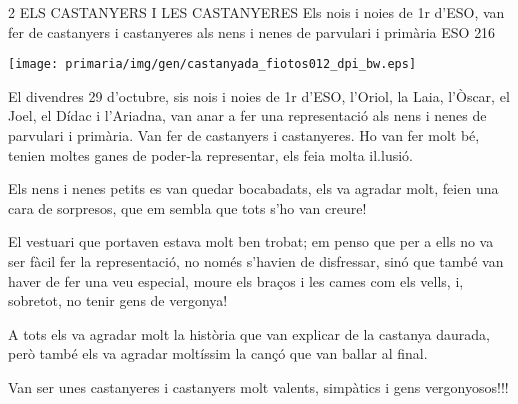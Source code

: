 %
%
\begin{news}
{2} %
{ELS CASTANYERS I LES CASTANYERES}
{Els nois i noies de 1r d’ESO,  van fer de castanyers i castanyeres als nens i nenes de parvulari i primària}
{ESO}
{216} %

\noindent\texttt{[image: primaria/img/gen/castanyada\_fiotos012\_dpi\_bw.eps]}

El divendres  29 d’octubre,  sis nois i noies de 1r d’ESO,  l’Oriol, la Laia, l’Òscar, el Joel, el Dídac i l’Ariadna,  van anar a fer una representació als nens i nenes de parvulari i primària. Van fer de castanyers i castanyeres. Ho van fer molt bé, tenien moltes ganes de poder-la representar, els feia molta il.lusió.

Els nens i nenes petits es van quedar bocabadats, els va agradar molt, feien una cara de sorpresos, que em sembla que tots s’ho van creure!

El vestuari que portaven estava molt ben trobat; em penso que per a ells no va ser fàcil fer la representació, no només s’havien de disfressar, sinó que també van haver de fer una veu especial, moure els braços i les cames com els vells, i, sobretot, no tenir gens de vergonya! 

A tots els va agradar molt la història que van explicar de la castanya daurada, però també els va agradar moltíssim la cançó que van ballar al final.

Van ser unes castanyeres i castanyers molt valents, simpàtics i gens vergonyosos!!!
						
\end{news}
